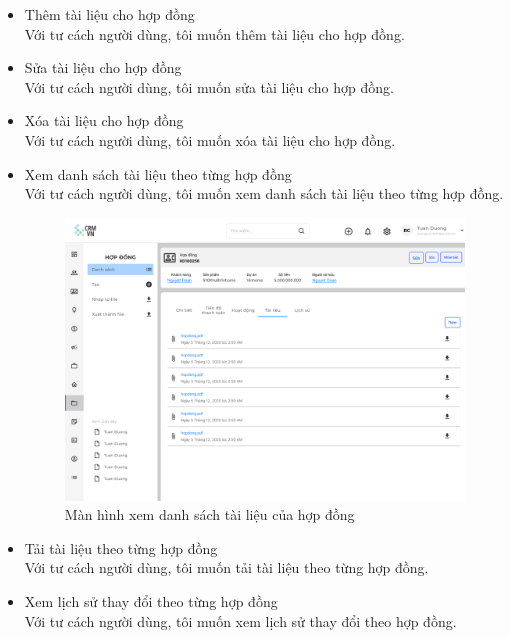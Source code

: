 \documentclass[12pt,a4paper]{article}
\begin{document}
\begin{enumerate}
\begin{itemize}
            \item Thêm tài liệu cho hợp đồng\\
            Với tư cách người dùng, tôi muốn thêm tài liệu cho hợp đồng.


            \item Sửa tài liệu cho hợp đồng\\
            Với tư cách người dùng, tôi muốn sửa tài liệu cho hợp đồng.

            \item Xóa tài liệu cho hợp đồng\\
            Với tư cách người dùng, tôi muốn xóa tài liệu cho hợp đồng.

            \item Xem danh sách tài liệu theo từng hợp đồng \\
            Với tư cách người dùng, tôi muốn xem danh sách tài liệu theo từng hợp đồng.


            \begin{figure}[H]
                \centering \includegraphics[width=\textwidth]{Img/Nguyet/Hopdong/tailieu.png}
                \vspace{0.5cm}
                \caption{Màn hình xem danh sách tài liệu của hợp đồng }
                \label{dstlhds}
            \end{figure}

            \item Tải tài liệu theo từng hợp đồng\\
            Với tư cách người dùng, tôi muốn tải tài liệu theo từng hợp đồng.

            \item Xem lịch sử thay đổi theo từng hợp đồng\\
            Với tư cách người dùng, tôi muốn xem lịch sử thay đổi theo hợp đồng.



\end{itemize}
\end{enumerate}
\end{document}
